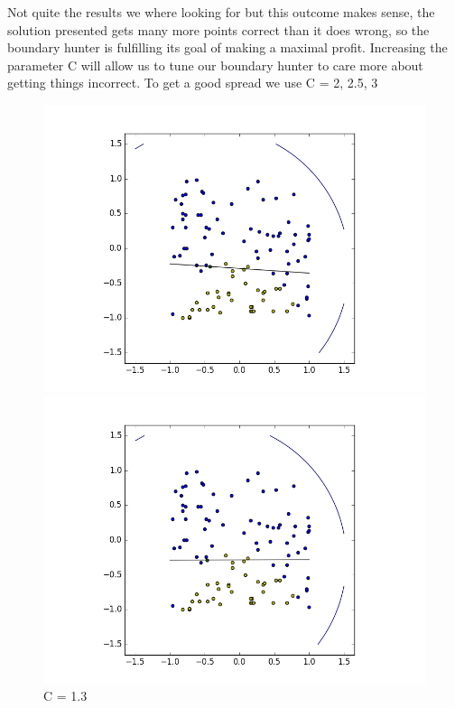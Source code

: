 \documentclass[notitlepage]{report}
\theoremstyle{definition}
\begin{document}
Not quite the results we where looking for but this outcome makes sense, the solution presented gets many more points correct than it does wrong, so the boundary hunter is fulfilling its goal of making a maximal profit. Increasing the parameter C will allow us to tune our boundary hunter to care more about getting things incorrect. To get a good spread we use C = 2, 2.5, 3

\begin{figure}[H]
  \centering
  \begin{minipage}[b]{0.49\textwidth}
    \includegraphics[width=\textwidth]{BoundaryHunter-Attempt3-02.png}
    \caption{C = 1.3}
  \end{minipage}
  \hfill
  \begin{minipage}[b]{0.49\textwidth}
    \includegraphics[width=\textwidth]{BoundaryHunter-Attempt3-03.png}

\end{minipage}
\end{figure}
\end{document}
